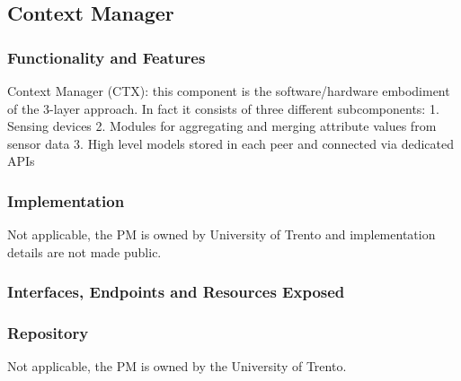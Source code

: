 \subsection{Context Manager}
\subsubsection{Functionality and Features}
Context Manager (CTX): this component is the software/hardware embodiment of the 3-layer approach. In fact it consists of three different subcomponents:
1. Sensing devices
2. Modules for aggregating and merging attribute values from sensor data 3. High level models stored in each peer and connected via dedicated APIs
\subsubsection{Implementation}
Not applicable, the PM is owned by University of Trento and implementation details are not made public.

\subsubsection{Interfaces, Endpoints and Resources Exposed}

\subsubsection{Repository}
Not applicable, the PM is owned by the University of Trento. 